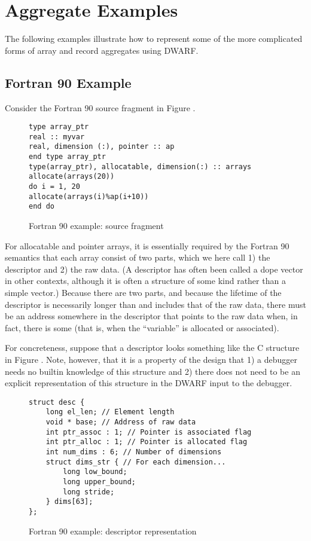 \clearpage

\section{Aggregate Examples}
\label{app:aggregateexamples}

The following examples illustrate how to represent some of
the more complicated forms of array and record aggregates
using DWARF.

\subsection{Fortran 90 Example}
\label{app:fortran90example}
Consider the Fortran 90 source fragment in 
Figure .

\begin{figure}[here]
\begin{lstlisting}
type array_ptr
real :: myvar
real, dimension (:), pointer :: ap
end type array_ptr
type(array_ptr), allocatable, dimension(:) :: arrays
allocate(arrays(20))
do i = 1, 20
allocate(arrays(i)%ap(i+10))
end do
\end{lstlisting}
\caption{Fortran 90 example: source fragment} \label{fig:fortran90examplesourcefragment}
\end{figure}

For allocatable and pointer arrays, it is essentially required
by the Fortran 90 semantics that each array consist of two
parts, which we here call 1) the descriptor and 2) the raw
data. (A descriptor has often been called a dope vector in
other contexts, although it is often a structure of some kind
rather than a simple vector.) Because there are two parts,
and because the lifetime of the descriptor is necessarily
longer than and includes that of the raw data, there must be
an address somewhere in the descriptor that points to the
raw data when, in fact, there is some (that is, when 
the ``variable'' is allocated or associated).

For concreteness, suppose that a descriptor looks something
like the C structure in 
Figure .
Note, however, that it is
a property of the design that 1) a debugger needs no builtin
knowledge of this structure and 2) there does not need to
be an explicit representation of this structure in the DWARF
input to the debugger.

\begin{figure}[here]
\begin{lstlisting}
struct desc {
    long el_len; // Element length
    void * base; // Address of raw data
    int ptr_assoc : 1; // Pointer is associated flag
    int ptr_alloc : 1; // Pointer is allocated flag
    int num_dims : 6; // Number of dimensions
    struct dims_str { // For each dimension...  
        long low_bound;
        long upper_bound;
        long stride;
    } dims[63];
};
\end{lstlisting}
\caption{Fortran 90 example: descriptor representation} \label{fig:fortran90exampledescriptorrepresentation}
\end{figure}


